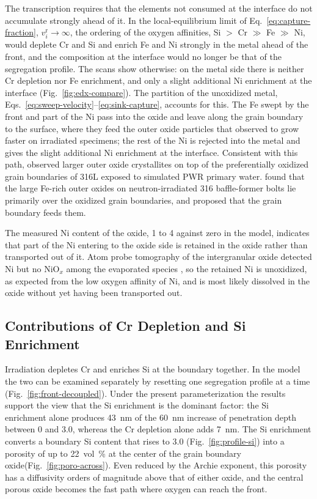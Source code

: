\documentclass[3p,times,nonatbib]{elsarticle} %
\begin{document}
The transcription requires that the elements not consumed at the interface do
not accumulate strongly ahead of it. In the local-equilibrium limit of
Eq.~\eqref{eq:capture-fraction}, \(v_i^{\mathrm{r}}\to\infty\), the ordering
of the oxygen affinities, Si \(>\) Cr \(\gg\) Fe \(\gg\) Ni, would deplete Cr
and Si and enrich Fe and Ni strongly in the metal ahead of the front, and the
composition at the interface would no longer be that of the segregation
profile. The scans show otherwise: on the metal side there is neither Cr
depletion nor Fe enrichment, and only a slight additional Ni enrichment at
the interface (Fig.~\ref{fig:edx-compare}). The partition of the unoxidized
metal, Eqs.~\eqref{eq:sweep-velocity}--\eqref{eq:sink-capture}, accounts for
this. The Fe swept by the front and part of the Ni pass into the oxide and
leave along the grain boundary to the surface, where they feed the outer
oxide particles that \textcite{deng2020corrosion} observed to grow faster on
irradiated specimens; the rest of the Ni is rejected into the metal and gives
the slight additional Ni enrichment at the interface. Consistent with this
path, \textcite{boisson2018effects} observed larger outer oxide crystallites
on top of the preferentially oxidized grain boundaries of 316L exposed to
simulated PWR primary water. \textcite{lach2025inservice} found that the
large Fe-rich outer oxides on neutron-irradiated 316 baffle-former bolts lie
primarily over the oxidized grain boundaries, and proposed that the grain
boundary feeds them.

The measured Ni content of the oxide, 1 to \SI{4}{\atpct} against
zero in the model, indicates that part of the Ni entering to the oxide side is
retained in the oxide rather than transported out of it. Atom probe
tomography of the intergranular oxide detected Ni but no NiO\(_x\) among the
evaporated species \cite{deng2021grain}, so the retained Ni is
unoxidized, as expected from the low oxygen affinity of Ni, and is most
likely dissolved in the oxide without yet having been transported out.

\subsection{Contributions of Cr Depletion and Si Enrichment}
\label{sec:discussionCrSi}

Irradiation depletes Cr and enriches Si at the boundary together. In the
model the two can be examined separately by resetting one segregation
profile at a time (Fig.~\ref{fig:front-decoupled}). Under the present parameterization the results support the view that the Si enrichment is the dominant factor: the Si
enrichment alone produces \SI{43}{nm} of the \SI{60}{nm} increase of penetration depth between 0 and \SI{3.0}{\dpa}, whereas the Cr depletion alone adds \SI{7}{nm}. The Si enrichment converts a
boundary Si content that rises to \SI{3.0}{\atpct} (Fig.~\ref{fig:profile-si})
into a porosity of up to \SI{22}{vol\percent} at the center of the grain boundary oxide(Fig.~\ref{fig:poro-across}). Even reduced by the Archie exponent, this
porosity has a diffusivity orders of magnitude above that of either oxide,
and the central porous oxide becomes the fast path where oxygen can reach the front.
\end{document}
